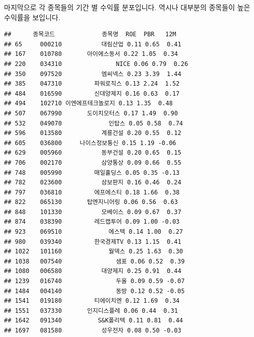 \documentclass[12pt,]{book}
\newenvironment{Shaded}{\begin{snugshade}}{\end{snugshade}}
\newcommand{\DecValTok}[1]{\textcolor[rgb]{0.00,0.00,0.81}{#1}}
\newcommand{\KeywordTok}[1]{\textcolor[rgb]{0.13,0.29,0.53}{\textbf{#1}}}
\newcommand{\NormalTok}[1]{#1}
\newcommand{\OperatorTok}[1]{\textcolor[rgb]{0.81,0.36,0.00}{\textbf{#1}}}
\newcommand{\StringTok}[1]{\textcolor[rgb]{0.31,0.60,0.02}{#1}}
\begin{document}
마지막으로 각 종목들의 기간 별 수익률 분포입니다. 역시나 대부분의 종목들이 높은 수익률을 보입니다.

\begin{Shaded}
\end{Shaded}

\begin{verbatim}
##      종목코드             종목명  ROE  PBR   12M
## 65     000210           대림산업 0.11 0.65  0.41
## 167    010780       아이에스동서 0.22 1.05  0.34
## 220    034310               NICE 0.06 0.79  0.26
## 350    097520           엠씨넥스 0.23 3.39  1.44
## 385    047310         파워로직스 0.13 2.24  1.52
## 484    016590         신대양제지 0.16 0.63  0.17
## 494    102710 이엔에프테크놀로지 0.13 1.35  0.48
## 507    067990       도이치모터스 0.17 1.49  0.90
## 532    049070             인탑스 0.05 0.58  0.74
## 596    013580           계룡건설 0.20 0.55  0.12
## 605    036800     나이스정보통신 0.15 1.19 -0.06
## 629    005960           동부건설 0.20 0.65  0.15
## 706    002170           삼양통상 0.09 0.66  0.55
## 748    005990         매일홀딩스 0.05 0.35 -0.13
## 782    023600           삼보판지 0.16 0.46  0.24
## 797    036810         에프에스티 0.18 1.66  0.38
## 822    065130       탑엔지니어링 0.06 0.56  0.63
## 848    101330           모베이스 0.09 0.67  0.37
## 874    038390         레드캡투어 0.09 1.00 -0.03
## 923    069510             에스텍 0.14 1.00  0.27
## 980    039340         한국경제TV 0.13 1.15  0.41
## 1022   101160             월덱스 0.25 1.63  0.30
## 1038   007540               샘표 0.06 0.52  0.39
## 1080   006580           대양제지 0.25 0.91  0.44
## 1239   016740               두올 0.09 0.59 -0.07
## 1484   004140               동방 0.12 0.52 -0.05
## 1541   019180         티에이치엔 0.12 1.69  0.34
## 1551   037330       인지디스플레 0.06 0.44  0.31
## 1642   091340          S&K폴리텍 0.11 0.81  0.44
## 1697   081580           성우전자 0.08 0.50 -0.03
\end{verbatim}
\end{document}
